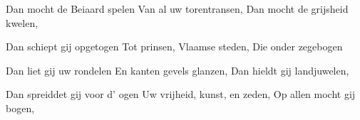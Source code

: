 \footnotemark [
ititle={Beiaardlied}]


\beginverse
Dan mocht de Beiaard spelen
Van al uw torentransen,
Dan mocht de grijsheid kwelen,
\endverse

\beginverse
Dan schiept gij opgetogen
Tot prinsen, Vlaamse steden,
Die onder zegebogen
\endverse

\beginverse
Dan liet gij uw rondelen
En kanten gevels glanzen,
Dan hieldt gij landjuwelen,
\endverse

\beginverse
Dan spreiddet gij voor d' ogen
Uw vrijheid, kunst, en zeden,
Op allen mocht gij bogen,
\endverse
\endsong